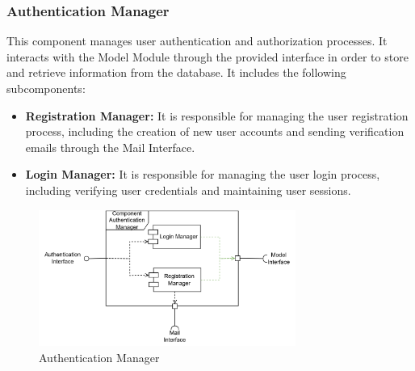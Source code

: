 \subsubsection{Authentication Manager}
This component manages user authentication and authorization processes. It interacts with the Model Module through the provided
interface in order to store and retrieve information from the database. It includes the following subcomponents:
\begin{itemize}
    \item \textbf{Registration Manager:} It is responsible for managing the user registration process, including the creation of new user accounts 
    and sending verification emails through the Mail Interface.
    \item \textbf{Login Manager:} It is responsible for managing the user login process, including verifying user credentials and maintaining user sessions.
\end{itemize}
\begin{figure}[H]
    \centering
    \includegraphics[width=0.75\textwidth]{Images/Components/auth_Component.png}
    \caption{Authentication Manager}\label{fig:auth_manager}
\end{figure}
